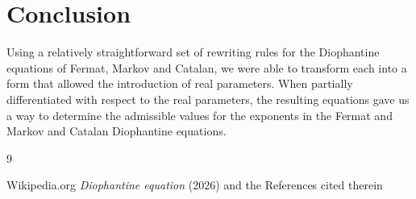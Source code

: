 \documentclass[11pt]{article}
\begin{document}
\section{Conclusion}


Using a relatively straightforward set of rewriting ru\-les for the Diophantine equations of Fermat, Markov and
Catalan, we were able to transform each into a form that allowed the introduction of real parameters.
When partially differentiated with respect to the real parameters, the resulting equations gave us a way to determine 
the admissible values for the exponents in the Fermat and Markov
and Catalan Diophantine equations.




% 
% 

\begin{thebibliography}{9}


 Wikipedia.org {\em Diophantine equation\/} 
                                    (2026) and the References cited therein


\end{thebibliography}
\end{document}
